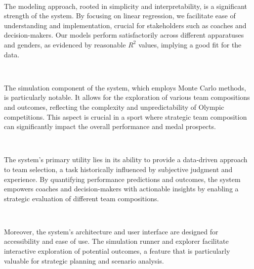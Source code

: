 \documentclass{article}
\begin{document}
\

\noindent The modeling approach, rooted in simplicity and interpretability, is a significant 
strength of the system. By focusing on linear regression, we facilitate ease of 
understanding and implementation, crucial for stakeholders such as coaches and decision-makers. 
Our models perform satisfactorily across different apparatuses and genders, as evidenced by reasonable 
$R^2$ values, implying a good fit for the data.

\

\noindent The simulation component of the system, which employs Monte Carlo 
methods, is particularly notable. It allows for the exploration of various team 
compositions and outcomes, reflecting the complexity and unpredictability of 
Olympic competitions. This aspect is crucial in a sport where strategic team 
composition can significantly impact the overall performance and medal prospects.

\

\noindent The system's primary utility lies in its ability to provide a data-driven 
approach to team selection, a task historically influenced by subjective judgment and experience. 
By quantifying performance predictions and outcomes, the system empowers coaches and 
decision-makers with actionable insights by enabling a strategic evaluation of different team compositions.

\

\noindent Moreover, the system's architecture and user interface are designed 
for accessibility and ease of use. The simulation runner and explorer facilitate 
interactive exploration of potential outcomes, a feature that is particularly valuable 
for strategic planning and scenario analysis.
\end{document}
